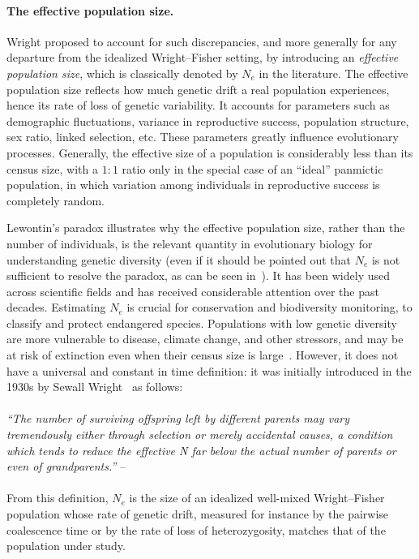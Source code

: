 \paragraph{The effective population size.}
Wright \cite{wright_evolution_1931} proposed to account for such discrepancies, and more generally for any departure from the idealized Wright--Fisher setting, by
introducing an \emph{effective population size}, which is classically denoted by $N_e$ in the literature.
The effective population size reflects how much genetic drift a real population experiences, hence its rate of loss of genetic variability. It accounts for parameters such as demographic fluctuations, variance in reproductive success, population structure, sex ratio, linked selection, etc. These parameters greatly influence evolutionary processes.
 Generally, the effective size of a population is considerably less than its census size,  with a $1:1$ ratio only in the special case of an ``ideal'' panmictic population, in which variation among individuals in reproductive success is completely random. 

Lewontin's paradox illustrates why the effective population size, rather than the number of individuals, is the relevant quantity in evolutionary biology for understanding genetic diversity (even if it should be pointed out that $N_e$ is not sufficient to resolve the paradox, as can be seen \eg in~\citet{buffalo_quantifying_2021}). It has been widely used across scientific fields and has received considerable attention over the past decades. Estimating $N_e$ is crucial for conservation and biodiversity monitoring, \eg to classify and protect endangered species. Populations with low genetic diversity are more vulnerable to disease, climate change, and other stressors, and may be at risk of extinction even when their census size is large~\cite{mergeay_importance_2026, frankham_effective_1995}.
However, it does not have a universal and constant in time definition: it was initially introduced in the 1930s by Sewall Wright~\cite{wright_evolution_1931} as follows:
\\
\\
\textit{
  ``The number of surviving offspring left by different parents may vary tremendously either through selection or merely accidental causes, a condition which tends to reduce the effective N far below the actual number of parents or even of grandparents.''
}--\citet{wright_evolution_1931}
\\
\\
From this definition, $N_e$ is the size of an idealized well-mixed Wright--Fisher population whose rate of genetic drift, measured for instance by the pairwise coalescence time or by the rate of loss of heterozygosity, matches that of the population under study. 

